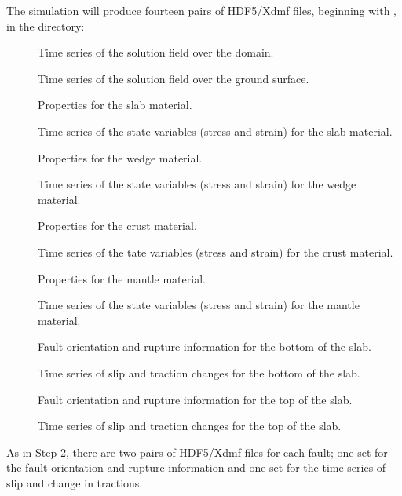 The simulation will produce fourteen pairs of HDF5/Xdmf files,
beginning with , in the 
directory:
\begin{description}
\item[] Time series of the solution field over the domain.
\item[] Time series of the solution field over the ground surface.
\item[] Properties for
  the slab material.
\item[] Time series of the state variables (stress and strain) for the slab material.
\item[] Properties for
  the wedge material.
\item[] Time series of the state variables (stress and strain) for the wedge material.
\item[] Properties for
  the crust material.
\item[] Time series of the tate variables
  (stress and strain) for the crust material.
\item[] Properties for
  the mantle material.
\item[] Time series of the state variables
  (stress and strain) for the mantle material.
\item[] Fault orientation
  and rupture information for the bottom of the slab.
\item[] Time series of slip and
  traction changes for the bottom of the slab.
\item[] Fault orientation
  and rupture information for the top of the slab.
\item[] Time series of slip and
  traction changes for the top of the slab.
\end{description}
As in Step 2, there are two pairs of HDF5/Xdmf files for
each fault; one set for the fault orientation and rupture information
and one set for the time series of slip and change in tractions.

